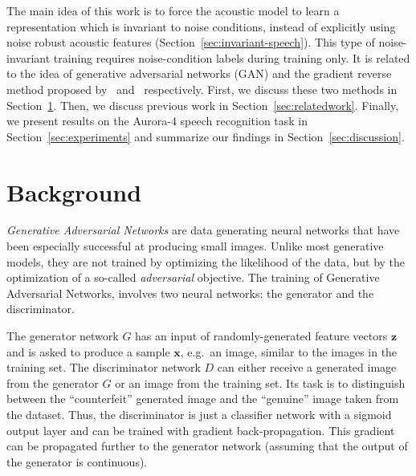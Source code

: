 \documentclass[a4paper]{article}
\begin{document}
    The main idea of this work is to force the acoustic model 
    to learn a representation which is invariant to noise conditions, instead of 
    explicitly using noise robust acoustic features 
    (Section~\ref{sec:invariant-speech}). This type of noise-invariant 
    training requires noise-condition labels during training only. It is 
    related to the idea of generative adversarial networks (GAN) and the 
    gradient reverse method proposed by~\cite{goodfellow2014generative} 
    and~\cite{ganin2014unsupervised} respectively. 
    First, we discuss these two methods in Section~\ref{sec:background}.
    Then, we discuss previous work in Section~\ref{sec:relatedwork}. 
    Finally, we present results on the Aurora-4 speech 
    recognition task in Section~\ref{sec:experiments} and summarize 
    our findings in Section~\ref{sec:discussion}.

\section{Background}
\label{sec:background}
\emph{Generative Adversarial Networks} are data generating neural networks that
    have been especially successful at producing small images.
    Unlike most generative models, they are not trained by optimizing the
    likelihood of the data, but by the optimization of a so-called
    \emph{adversarial} objective. The training of Generative Adversarial
    Networks, involves two neural networks: the generator and the discriminator. 

    The generator network $G$ has an
    input of randomly-generated feature vectors $\bm{z}$ and is asked to produce a
    sample $\bm{x}$, e.g.\ an image, similar to the images in the training set. The discriminator network $D$
    can either receive a generated image from the generator $G$ or an image
    from the training set. Its task is to distinguish
    between the ``counterfeit'' generated image and the ``genuine'' image taken from the dataset. Thus,
    the discriminator is just a classifier network with a sigmoid output layer
    and can be trained with gradient back-propagation. This gradient can be propagated further
    to the generator network (assuming that the output of the generator is
    continuous).
\end{document}
